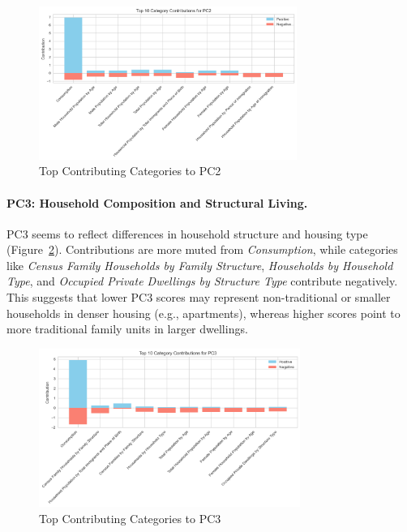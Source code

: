 \documentclass{article}
\begin{document}
\begin{figure}[H]
    \centering
    \includegraphics[width=0.75\textwidth]{figures/pc2_contribs.png}
    \caption{Top Contributing Categories to PC2}
    \label{fig:pc2}
\end{figure}

\paragraph{PC3: Household Composition and Structural Living.}  
PC3 seems to reflect differences in household structure and housing type (Figure~\ref{fig:pc3}). Contributions are more muted from \textit{Consumption}, while categories like \textit{Census Family Households by Family Structure}, \textit{Households by Household Type}, and \textit{Occupied Private Dwellings by Structure Type} contribute negatively. This suggests that lower PC3 scores may represent non-traditional or smaller households in denser housing (e.g., apartments), whereas higher scores point to more traditional family units in larger dwellings.

\begin{figure}[H]
    \centering
    \includegraphics[width=0.76\textwidth]{figures/pc3_contribs.png}
    \caption{Top Contributing Categories to PC3}
    \label{fig:pc3}
\end{figure}
\end{document}
